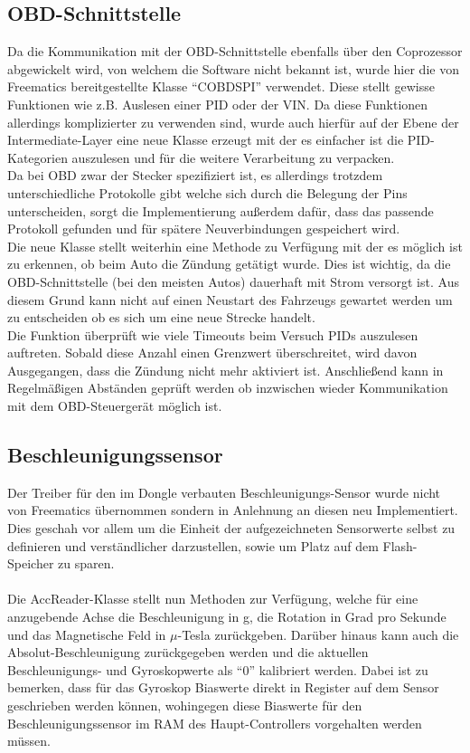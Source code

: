 \subsection{ \ac{OBD}-Schnittstelle}
	Da die Kommunikation mit der \ac{OBD}-Schnittstelle ebenfalls über den Coprozessor abgewickelt wird, von welchem die Software nicht bekannt ist, wurde hier die von Freematics bereitgestellte Klasse \enquote{COBDSPI} verwendet. Diese stellt gewisse Funktionen wie z.B. Auslesen einer \ac{PID} oder der \ac{VIN}. Da diese Funktionen allerdings komplizierter zu verwenden sind, wurde auch hierfür auf der Ebene der Intermediate-Layer eine neue Klasse erzeugt mit der es einfacher ist die \ac{PID}-Kategorien auszulesen und für die weitere Verarbeitung zu verpacken.
	\\
	Da bei \ac{OBD} zwar der Stecker spezifiziert ist, es allerdings trotzdem unterschiedliche Protokolle gibt welche sich durch die Belegung der Pins unterscheiden, sorgt die Implementierung außerdem dafür, dass das passende Protokoll gefunden und für spätere Neuverbindungen gespeichert wird.
	\\
	Die neue Klasse stellt weiterhin eine Methode zu Verfügung mit der es möglich ist zu erkennen, ob beim Auto die Zündung getätigt wurde. Dies ist wichtig, da die \ac{OBD}-Schnittstelle (bei den meisten Autos) dauerhaft mit Strom versorgt ist. Aus diesem Grund kann nicht auf einen Neustart des Fahrzeugs gewartet werden um zu entscheiden ob es sich um eine neue Strecke handelt.
	\\
	Die Funktion überprüft wie viele Timeouts beim Versuch \acp{PID} auszulesen auftreten. Sobald diese Anzahl einen Grenzwert überschreitet, wird davon Ausgegangen, dass die Zündung nicht mehr aktiviert ist. Anschließend kann in Regelmäßigen Abständen geprüft werden ob inzwischen wieder Kommunikation mit dem \ac{OBD}-Steuergerät möglich ist. 
	


\subsection{Beschleunigungssensor}
Der Treiber für den im Dongle verbauten Beschleunigungs-Sensor wurde nicht von Freematics übernommen sondern in Anlehnung an diesen neu Implementiert. Dies geschah vor allem um die Einheit der aufgezeichneten Sensorwerte selbst zu definieren und verständlicher darzustellen, sowie um Platz auf dem Flash-Speicher zu sparen.
\paragraph{}
Die AccReader-Klasse stellt nun Methoden zur Verfügung, welche für eine anzugebende Achse die Beschleunigung in g, die Rotation in Grad pro Sekunde und das Magnetische Feld in $\mu$-Tesla zurückgeben. Darüber hinaus kann auch die Absolut-Beschleunigung zurückgegeben werden und die aktuellen Beschleunigungs- und Gyroskopwerte als \enquote{0} kalibriert werden. Dabei ist zu bemerken, dass für das Gyroskop Biaswerte direkt in Register auf dem Sensor geschrieben werden können, wohingegen diese Biaswerte für den Beschleunigungssensor im RAM des Haupt-Controllers vorgehalten werden müssen.
